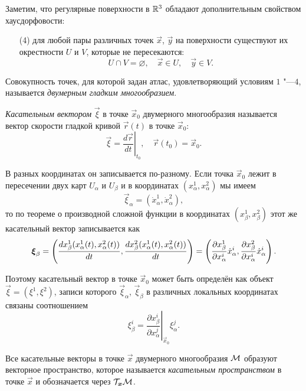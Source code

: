 Заметим, что регулярные поверхности в $\mathbb{R}^3$ обладают дополнительным свойством хаусдорфовости:
\begin{enumerate}[nolistsep, label=(\arabic*)]
	\item[(4)] для любой пары различных точек $\vec{x}$, $\vec{y}$ на поверхности существуют их окрестности $U$ и $V$, которые не пересекаются:
		\[
			U \cap V = \varnothing,\quad \vec{x} \in U,\quad \vec{y} \in V.
		\]
\end{enumerate}

\begin{definition}
	Совокупность точек, для которой задан атлас, удовлетворяющий условиям $1$ "---$4$, называется \textit{двумерным гладким многообразием}.
\end{definition}

\begin{definition}
	\textit{Касательным вектором} $\vec{\xi}$ в точке $\vec{x}_0$ двумерного многообразия называется вектор скорости гладкой кривой $\vec{r}(t)$ в точке $\vec{x}_0$:
	\[
		\vec{\xi} = \left.\frac{d\vec{r}}{dt}\right|_{t_0},\quad \vec{r}(t_0) = \vec{x}_0.
	\]
\end{definition}

В разных координатах он записывается по-разному. Если точка $\vec{x}_0$ лежит в пересечении двух карт $U_\alpha$ и $U_\beta$ и в координатах $(x_\alpha^1, x_\alpha^2)$ мы имеем
\[
	\vec{\xi}_\alpha = (\dot{x}^1_\alpha, \dot{x}^2_\alpha),
\]
то по теореме о производной сложной функции в координатах $(x_\beta^1, x_\beta^2)$ этот же касательный вектор записывается как
\[
	\boldsymbol{\xi}_\beta = \left(\frac{dx_\beta^1(x_\alpha^1(t), x_\alpha^2(t))}{dt}, \frac{dx_\beta^2(x_\alpha^1(t), x_\alpha^2(t))}{dt}\right) = \left(\frac{\partial x_\beta^1}{\partial x^i_\alpha}\dot{x}_\alpha^i, \frac{\partial x_\beta^2}{\partial x^i_\alpha}\dot{x}_\alpha^i\right).
\]

Поэтому касательный вектор в точке $\vec{x}_0$ может быть определён как объект $\vec{\xi} = (\xi^1, \xi^2)$, записи которого $\vec{\xi}_\alpha$, $\vec{\xi}_\beta$ в различных локальных координатах связаны соотношением
\[
	\xi_\beta^i = \left.\frac{\partial x_\beta^i}{\partial x_\alpha^j}\right|_{\vec{x}_0}\xi^j_\alpha.
\]

\begin{definition}
	Все касательные векторы в точке $\vec{x}$ двумерного многообразия $\mathcal{M}$ образуют векторное пространство, которое называется \textit{касательным пространством} в точке $\vec{x}$ и обозначается через $\mathcal{T}_{\boldsymbol{x}}\mathcal{M}$.
\end{definition}

